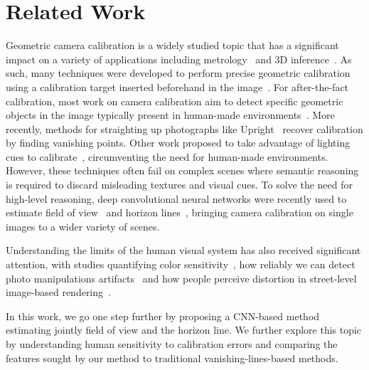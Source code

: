 
\section{Related Work}







Geometric camera calibration is a widely studied topic that has a significant impact on a variety of applications including metrology~\cite{Criminisi2000} and 3D inference~\cite{Criminisi00,Fouhey2013}. As such, many techniques were developed to perform precise geometric calibration using a calibration target inserted beforehand in the image~\cite{Sturm1999,Zhang2002,Heikkila1997,Chen2004}. For after-the-fact calibration, most work on camera calibration aim to detect specific geometric objects in the image typically present in human-made environments~\cite{Rother2000,Melo2013}. More recently, methods for straighting up photographs like Upright~\cite{Lee2014} recover calibration by finding vanishing points. Other work proposed to take advantage of lighting cues to calibrate~\cite{Lalonde2010,Workman2014}, circumventing the need for human-made environments. However, these techniques often fail on complex scenes where semantic reasoning is required to discard misleading textures and visual cues. To solve the need for high-level reasoning, deep convolutional neural networks were recently used to estimate field of view~\cite{Workman2015a} and horizon lines~\cite{Workman2016}, bringing camera calibration on single images to a wider variety of scenes.

Understanding the limits of the human visual system has also received significant attention, with studies quantifying color sensitivity~\cite{fairchild2013color}, how reliably we can detect photo manipulations artifacts~\cite{Farid2010} and how people perceive distortion in street-level image-based rendering~\cite{Vangorp2013}.

In this work, we go one step further by proposing a CNN-based method estimating jointly field of view and the horizon line. We further explore this topic by understanding human sensitivity to calibration errors and comparing the features sought by our method to traditional vanishing-lines-based methods.
